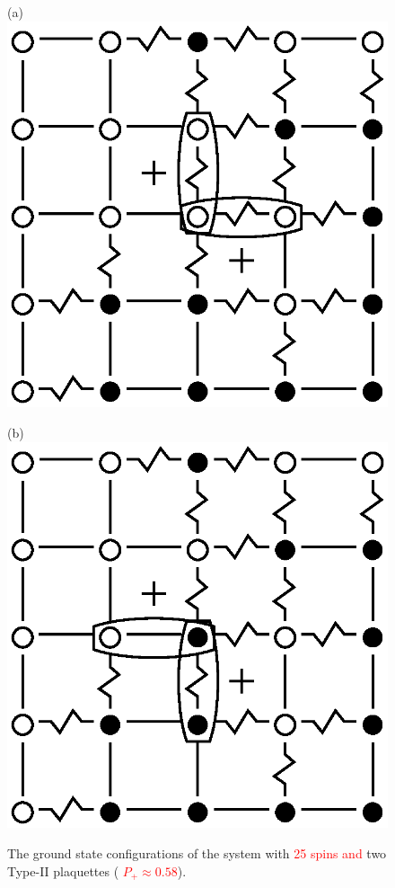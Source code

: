 \documentclass[preprint,12pt]{elsarticle}
\begin{document}
	\begin{figure}[H]
		\centering
		\begin{minipage}[h]{0.25\linewidth}
			\centering(a)
			\includegraphics[width=1\linewidth]{pictures/Cl5x5_Type2_gs1.eps}
		\end{minipage}
		\hspace{15pt}
		\begin{minipage}[h]{0.25\linewidth}
			\centering(b)
			\includegraphics[width=1\linewidth]{pictures/Cl5x5_Type2_gs2.eps}
		\end{minipage}
		\caption{The ground state configurations of the system with \textcolor{red}{25 spins and} two Type-II plaquettes (\textcolor{red}{  $P_+\approx0.58$}).}
		\label{fig:5x5.22F}
	\end{figure}
	
\end{document}
